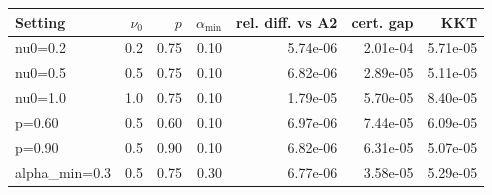 \begin{tabular}{lrrrrrr}
\toprule
Setting & $\nu_0$ & $p$ & $\alpha_{\min}$ & rel. diff. vs A2 & cert. gap & KKT \\
\midrule
nu0=0.2 & 0.2 & 0.75 & 0.10 & 5.74e-06 & 2.01e-04 & 5.71e-05 \\
nu0=0.5 & 0.5 & 0.75 & 0.10 & 6.82e-06 & 2.89e-05 & 5.11e-05 \\
nu0=1.0 & 1.0 & 0.75 & 0.10 & 1.79e-05 & 5.70e-05 & 8.40e-05 \\
p=0.60 & 0.5 & 0.60 & 0.10 & 6.97e-06 & 7.44e-05 & 6.09e-05 \\
p=0.90 & 0.5 & 0.90 & 0.10 & 6.82e-06 & 6.31e-05 & 5.07e-05 \\
alpha\_min=0.3 & 0.5 & 0.75 & 0.30 & 6.77e-06 & 3.58e-05 & 5.29e-05 \\
\bottomrule
\end{tabular}